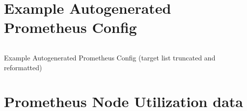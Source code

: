 \section{Example Autogenerated Prometheus Config}
\begin{listing}[H]
  \inputminted{yaml}{./prom.yml}
\caption{Example Autogenerated Prometheus Config (target list truncated and reformatted)}
\end{listing}
\section{Prometheus Node Utilization data}
